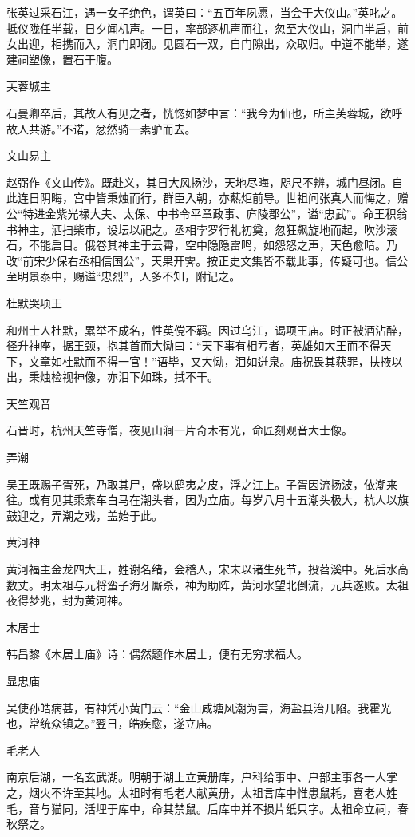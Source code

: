 \documentclass[a4paper,12pt,UTF8,twoside]{ctexbook}
\begin{document}
    张英过采石江，遇一女子绝色，谓英曰：“五百年夙愿，当会于大仪山。”英叱之。抵仪陇任半载，日夕闻机声。一日，率部逐机声而往，忽至大仪山，洞门半启，前女出迎，相携而入，洞门即闭。见圆石一双，自门隙出，众取归。中道不能举，遂建祠塑像，置石于腹。
    
    芙蓉城主
    
    石曼卿卒后，其故人有见之者，恍惚如梦中言：“我今为仙也，所主芙蓉城，欲呼故人共游。”不诺，忿然骑一素驴而去。
    
    文山易主
    
    赵弼作《文山传》。既赴义，其日大风扬沙，天地尽晦，咫尺不辨，城门昼闭。自此连日阴晦，宫中皆秉烛而行，群臣入朝，亦爇炬前导。世祖问张真人而悔之，赠公“特进金紫光禄大夫、太保、中书令平章政事、庐陵郡公”，谥“忠武”。命王积翁书神主，洒扫柴市，设坛以祀之。丞相孛罗行礼初奠，忽狂飙旋地而起，吹沙滚石，不能启目。俄卷其神主于云霄，空中隐隐雷鸣，如怨怒之声，天色愈暗。乃改“前宋少保右丞相信国公”，天果开霁。按正史文集皆不载此事，传疑可也。信公至明景泰中，赐谥“忠烈”，人多不知，附记之。
    
    杜默哭项王
    
    和州士人杜默，累举不成名，性英傥不羁。因过乌江，谒项王庙。时正被酒沾醉，径升神座，据王颈，抱其首而大恸曰：“天下事有相亏者，英雄如大王而不得天下，文章如杜默而不得一官！”语毕，又大恸，泪如迸泉。庙祝畏其获罪，扶掖以出，秉烛检视神像，亦泪下如珠，拭不干。
    
    天竺观音
    
    石晋时，杭州天竺寺僧，夜见山涧一片奇木有光，命匠刻观音大士像。
    
    弄潮
    
    吴王既赐子胥死，乃取其尸，盛以鸱夷之皮，浮之江上。子胥因流扬波，依潮来往。或有见其乘素车白马在潮头者，因为立庙。每岁八月十五潮头极大，杭人以旗鼓迎之，弄潮之戏，盖始于此。
    
    黄河神
    
    黄河福主金龙四大王，姓谢名绪，会稽人，宋末以诸生死节，投苕溪中。死后水高数丈。明太祖与元将蛮子海牙厮杀，神为助阵，黄河水望北倒流，元兵遂败。太祖夜得梦兆，封为黄河神。
    
    木居士
    
    韩昌黎《木居士庙》诗：偶然题作木居士，便有无穷求福人。
    
    显忠庙
    
    吴使孙皓病甚，有神凭小黄门云：“金山咸塘风潮为害，海盐县治几陷。我霍光也，常统众镇之。”翌日，皓疾愈，遂立庙。
    
    毛老人
    
    南京后湖，一名玄武湖。明朝于湖上立黄册库，户科给事中、户部主事各一人掌之，烟火不许至其地。太祖时有毛老人献黄册，太祖言库中惟患鼠耗，喜老人姓毛，音与猫同，活埋于库中，命其禁鼠。后库中并不损片纸只字。太祖命立祠，春秋祭之。
    
\end{document}
